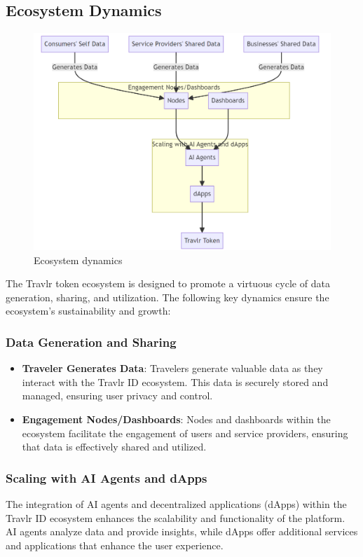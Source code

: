 \documentclass{article}
\begin{document}
\subsection{Ecosystem Dynamics}
\begin{figure}
    \centering
    \includegraphics[width=0.8\linewidth]{travlr_diagram_1.png}
    \caption{Ecosystem dynamics}
    \label{fig:enter-label}
\end{figure}
The Travlr token ecosystem is designed to promote a virtuous cycle of data generation, sharing, and utilization. The following key dynamics ensure the ecosystem's sustainability and growth:

\subsubsection{Data Generation and Sharing}

\begin{itemize}
    \item \textbf{Traveler Generates Data}: Travelers generate valuable data as they interact with the Travlr ID ecosystem. This data is securely stored and managed, ensuring user privacy and control.
    \item \textbf{Engagement Nodes/Dashboards}: Nodes and dashboards within the ecosystem facilitate the engagement of users and service providers, ensuring that data is effectively shared and utilized.
\end{itemize}

\subsubsection{Scaling with AI Agents and dApps}

The integration of AI agents and decentralized applications (dApps) within the Travlr ID ecosystem enhances the scalability and functionality of the platform. AI agents analyze data and provide insights, while dApps offer additional services and applications that enhance the user experience.
\end{document}
